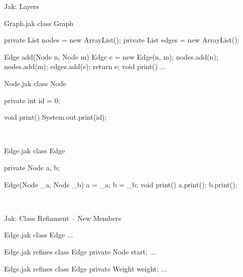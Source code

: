 \begin{frame}[fragile]{Jak: Layers}
	\begin{mycolumns}[widths={60,40},animation=none]
	\mynextcolumn
	\end{mycolumns}
	\begin{mycolumns}[columns=3,widths={43,27,30},animation=none]
\begin{codetight}{Graph.jak}
class Graph {
	private List nodes = new ArrayList();
	private List edges = new ArrayList();
	
	Edge add(Node n, Node m) {
		Edge e = new Edge(n, m);
		nodes.add(n); nodes.add(m); edges.add(e);
		return e;
	}
	void print() { ... }
}
\end{codetight}		
	\mynextcolumn
\begin{codetight}{Node.jak}
class Node {
	private int id = 0;

	void print() {
		System.out.print(id);
	}
}
~
~
~
~
~
\end{codetight}
	\mynextcolumn
\begin{codetight}{Edge.jak}
class Edge {
	private Node a, b;
	
	Edge(Node _a, Node _b) {
		a = _a; b = _b;
	}
	void print() {
		a.print(); b.print();
	}
}
~
~
\end{codetight}			
	\end{mycolumns}
\end{frame}

\begin{frame}[fragile]{Jak: Class Refinment – New Members}
	\begin{mycolumns}[widths={50,50},animation=none]
	\mynextcolumn
{\small
\begin{codetight}{Edge.jak}
class Edge {
	...
}
\end{codetight}
\begin{codetight}{Edge.jak}
refines class Edge {
	private Node start;
	...
}
\end{codetight}
\begin{codetight}{Edge.jak}
refines class Edge {
	private Weight weight;
	...
}
\end{codetight}
}
	\end{mycolumns}
\end{frame}

